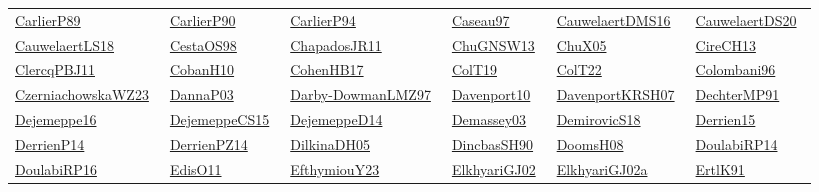 \begin{longtable}{*{6}{l}}
\href{}{CarlierP89}~\cite{CarlierP89} & \href{}{CarlierP90}~\cite{CarlierP90} & \href{}{CarlierP94}~\cite{CarlierP94} & \href{works/Caseau97.pdf}{Caseau97}~\cite{Caseau97} & \href{works/CauwelaertDMS16.pdf}{CauwelaertDMS16}~\cite{CauwelaertDMS16} & \href{}{CauwelaertDS20}~\cite{CauwelaertDS20}\\ 
\href{works/CauwelaertLS18.pdf}{CauwelaertLS18}~\cite{CauwelaertLS18} & \href{works/CestaOS98.pdf}{CestaOS98}~\cite{CestaOS98} & \href{works/ChapadosJR11.pdf}{ChapadosJR11}~\cite{ChapadosJR11} & \href{works/ChuGNSW13.pdf}{ChuGNSW13}~\cite{ChuGNSW13} & \href{works/ChuX05.pdf}{ChuX05}~\cite{ChuX05} & \href{works/CireCH13.pdf}{CireCH13}~\cite{CireCH13}\\ 
\href{works/ClercqPBJ11.pdf}{ClercqPBJ11}~\cite{ClercqPBJ11} & \href{works/CobanH10.pdf}{CobanH10}~\cite{CobanH10} & \href{works/CohenHB17.pdf}{CohenHB17}~\cite{CohenHB17} & \href{works/ColT19.pdf}{ColT19}~\cite{ColT19} & \href{works/ColT22.pdf}{ColT22}~\cite{ColT22} & \href{works/Colombani96.pdf}{Colombani96}~\cite{Colombani96}\\ 
\href{works/CzerniachowskaWZ23.pdf}{CzerniachowskaWZ23}~\cite{CzerniachowskaWZ23} & \href{works/DannaP03.pdf}{DannaP03}~\cite{DannaP03} & \href{works/Darby-DowmanLMZ97.pdf}{Darby-DowmanLMZ97}~\cite{Darby-DowmanLMZ97} & \href{works/Davenport10.pdf}{Davenport10}~\cite{Davenport10} & \href{works/DavenportKRSH07.pdf}{DavenportKRSH07}~\cite{DavenportKRSH07} & \href{}{DechterMP91}~\cite{DechterMP91}\\ 
\href{works/Dejemeppe16.pdf}{Dejemeppe16}~\cite{Dejemeppe16} & \href{works/DejemeppeCS15.pdf}{DejemeppeCS15}~\cite{DejemeppeCS15} & \href{works/DejemeppeD14.pdf}{DejemeppeD14}~\cite{DejemeppeD14} & \href{works/Demassey03.pdf}{Demassey03}~\cite{Demassey03} & \href{works/DemirovicS18.pdf}{DemirovicS18}~\cite{DemirovicS18} & \href{works/Derrien15.pdf}{Derrien15}~\cite{Derrien15}\\ 
\href{works/DerrienP14.pdf}{DerrienP14}~\cite{DerrienP14} & \href{works/DerrienPZ14.pdf}{DerrienPZ14}~\cite{DerrienPZ14} & \href{works/DilkinaDH05.pdf}{DilkinaDH05}~\cite{DilkinaDH05} & \href{works/DincbasSH90.pdf}{DincbasSH90}~\cite{DincbasSH90} & \href{works/DoomsH08.pdf}{DoomsH08}~\cite{DoomsH08} & \href{works/DoulabiRP14.pdf}{DoulabiRP14}~\cite{DoulabiRP14}\\ 
\href{works/DoulabiRP16.pdf}{DoulabiRP16}~\cite{DoulabiRP16} & \href{works/EdisO11.pdf}{EdisO11}~\cite{EdisO11} & \href{works/EfthymiouY23.pdf}{EfthymiouY23}~\cite{EfthymiouY23} & \href{works/ElkhyariGJ02.pdf}{ElkhyariGJ02}~\cite{ElkhyariGJ02} & \href{works/ElkhyariGJ02a.pdf}{ElkhyariGJ02a}~\cite{ElkhyariGJ02a} & \href{works/ErtlK91.pdf}{ErtlK91}~\cite{ErtlK91}\\ 

\end{longtable}

